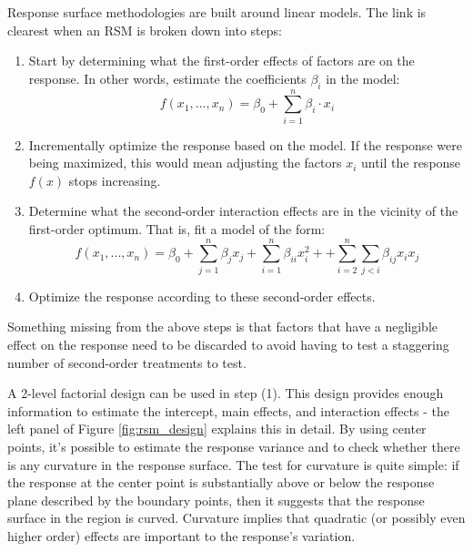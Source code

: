 \documentclass[11pt,a4paper,article]{memoir} %
\begin{document}
Response surface methodologies are built around linear models. The link is clearest when an RSM is broken down into steps:
\begin{enumerate}
\item Start by determining what the first-order effects of factors are on the response. In other words, estimate the coefficients $\beta_i$ in the model:
\begin{equation}
	f(x_1, ..., x_n) = \beta_0 + \sum_{i = 1}^n \beta_i \cdot x_i
\end{equation}
\item Incrementally optimize the response based on the model. If the response were being maximized, this would mean adjusting the factors $x_i$ until the response $f(x)$ stops increasing. 
\item Determine what the second-order interaction effects are in the vicinity of the first-order optimum. That is, fit a model of the form:
\begin{equation}
	f(x_1, ..., x_n) = \beta_0 + \sum_{j = 1}^n \beta_{j} x_j + \sum_{i = 1}^n \beta_{ii} x_i^2 + + \sum_{i = 2}^n \sum_{j < i}\beta_{ij} x_i x_j
\end{equation}
\item Optimize the response according to these second-order effects.
\end{enumerate}
Something missing from the above steps is that factors that have a negligible effect on the response need to be discarded to avoid having to test a staggering number of second-order treatments to test.

A 2-level factorial design can be used in step (1). This design provides enough information to estimate the intercept, main effects, and interaction effects - the left panel of Figure \ref{fig:rsm_design} explains this in detail. By using center points, it's possible to estimate the response variance and to check whether there is any curvature in the response surface. The test for curvature is quite simple: if the response at the center point is substantially above or below the response plane described by the boundary points, then it suggests that the response surface in the region is curved. Curvature implies that quadratic (or possibly even higher order) effects are important to the response's variation.
\end{document}
